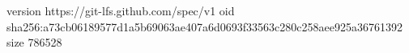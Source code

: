 version https://git-lfs.github.com/spec/v1
oid sha256:a73cb06189577d1a5b69063ae407a6d0693f33563c280c258aee925a36761392
size 786528
